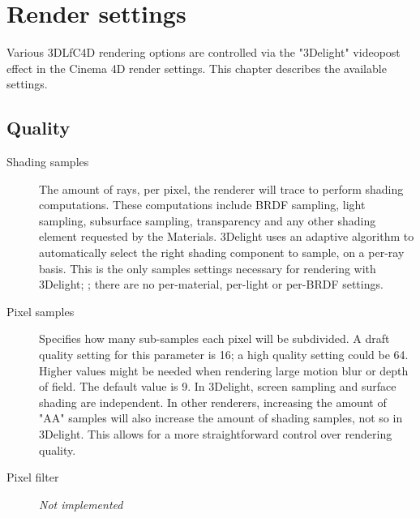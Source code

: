 \documentclass{book}
\begin{document}
\chapter{Render settings}
Various 3DLfC4D rendering options are controlled via the "3Delight" videopost effect in the Cinema 4D render settings. This chapter describes the available settings. 

\section{Quality}

\begin{description}
\item[Shading samples] The amount of rays, per pixel, the renderer will trace to perform shading computations. These computations include BRDF sampling, light sampling, subsurface sampling, transparency and any other shading element requested by the Materials. 3Delight uses an adaptive algorithm to automatically select the right shading component to sample, on a per-ray basis.  This is the only samples settings necessary for rendering with 3Delight; ; there are no per-material, per-light or per-BRDF settings.

\item[Pixel samples] Specifies how many sub-samples each pixel will be subdivided. A draft quality setting for this parameter is 16; a high quality setting could be 64. Higher values might be needed when rendering large motion blur or depth of field. The default value is 9. In 3Delight, screen sampling and surface shading are independent. In other renderers, increasing the amount of "AA" samples will also increase the amount of shading samples, not so in 3Delight. This allows for a more straightforward control over rendering quality.

\item [Pixel filter] \emph{Not implemented}


\end{description}
\end{document}
